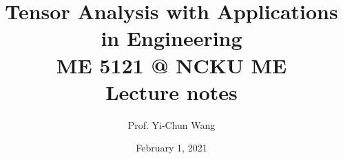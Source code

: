\makeatletter
\DeclareRobustCommand{\volume}{\text{\volumedash}V}
\newcommand{\volumedash}{%
  \makebox[0pt][l]{%
    \ooalign{\hfil\hphantom{$\m@th V$}\hfil\cr\kern0.08em--\hfil\cr}%
  }%
}
%
\makeatother



\title{%
Tensor Analysis with Applications in Engineering \\
  \large ME 5121 @ NCKU ME\\
  Lecture notes}

\author{Prof. Yi-Chun Wang}
\date{February 1, 2021}







\usepackage{hyperref}
\hypersetup{hidelinks,
	colorlinks=true,
	allcolors=black,
	pdfstartview=Fit,
	breaklinks=true
}


\newcommand{\vc}[3]{\overset{#2}{\underset{#3}{#1}}}

\stackMath
\newcommand\tenq[2][1]{%
 \def\useanchorwidth{T}%
  \ifnum#1>1%
    \stackunder[0pt]{\tenq[\numexpr#1-1\relax]{#2}}{\scriptscriptstyle\sim}%
  \else%
    \stackunder[1pt]{#2}{\scriptscriptstyle\sim}%
  \fi%
}


\DeclareMathOperator\erf{erf}
\DeclareMathOperator\erfc{erfc}

\DeclareMathOperator\Arg{Arg}
\DeclareMathOperator\Log{Log}

\DeclareMathOperator\arcsec{arcsec}
\DeclareMathOperator\arccot{arccot}
\DeclareMathOperator\arccsc{arccsc}
\DeclareMathOperator\tr{tr}

\def\Res{\mathop{\text{Res}}\limits}
